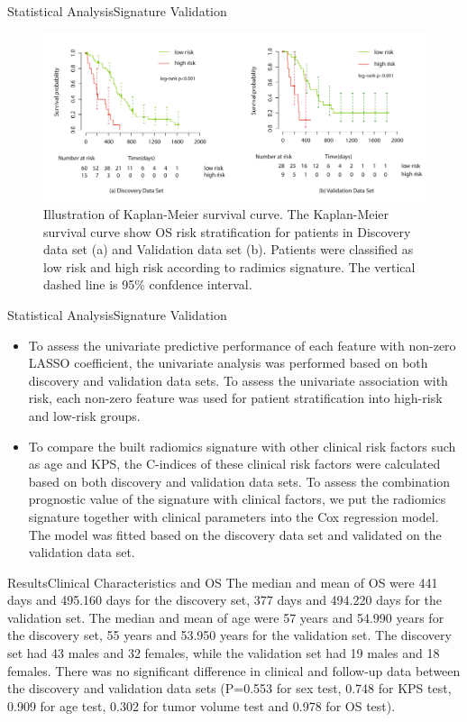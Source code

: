 \documentclass[
]{beamer}
\begin{document}
\begin{frame}{Statistical Analysis}{Signature Validation}
\begin{figure}
	\includegraphics[scale=0.45]{km1}
	\caption{Illustration of Kaplan-Meier survival curve. The Kaplan-Meier survival curve show OS risk
		stratification for patients in Discovery data set (a) and Validation data set (b). Patients were classified as low risk
		and high risk according to radimics signature. The vertical dashed line is 95\% confdence interval.}
\end{figure}
\end{frame}

\begin{frame}{Statistical Analysis}{Signature Validation}
\begin{itemize}
	\item To assess the univariate predictive performance of each feature with non-zero LASSO coefficient, the univariate
	analysis was performed based on both discovery and validation data sets. To assess the univariate association
	with risk, each non-zero feature was used for patient stratification into high-risk and low-risk groups.
	\item To compare the built radiomics signature with other clinical risk factors such as age and KPS, the C-indices of
	these clinical risk factors were calculated based on both discovery and validation data sets. To assess the combination
	prognostic value of the signature with clinical factors, we put the radiomics signature together with clinical
	parameters into the Cox regression model. The model was fitted based on the discovery data set and validated on
	the validation data set. 
\end{itemize}
\end{frame}


\begin{frame}{Results}{Clinical Characteristics and OS}
The median and mean of OS were 441 days and 495.160 days for the discovery
set, 377 days and 494.220 days for the validation set. The median and mean of age were 57 years and 54.990
years for the discovery set, 55 years and 53.950 years for the validation set. The discovery set had 43 males and 32
females, while the validation set had 19 males and 18 females. There was no significant difference in clinical and
follow-up data between the discovery and validation data sets (P=0.553 for sex test, 0.748 for KPS test, 0.909 for
age test, 0.302 for tumor volume test and 0.978 for OS test).
\end{frame}
\end{document}
